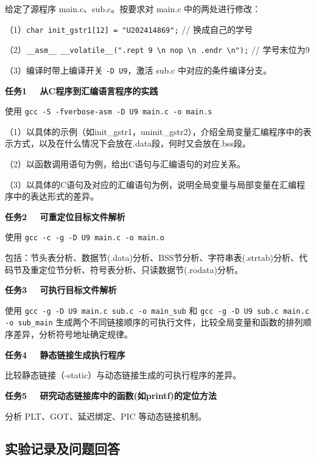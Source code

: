 \documentclass[12pt,a4paper]{ctexart}
\newcommand{\studentid}{U202414869}
\begin{document}
给定了源程序 main.c、sub.c。按要求对 main.c 中的两处进行修改：

（1）\texttt{char init\_gstr1[12] = "\studentid";} \quad // 换成自己的学号

（2）\texttt{\_\_asm\_\_ \_\_volatile\_\_(".rept 9 \textbackslash n nop \textbackslash n .endr \textbackslash n");} \quad // 学号末位为9

（3）编译时带上编译开关 \texttt{-D U9}，激活 sub.c 中对应的条件编译分支。

\vspace{0.3cm}
\textbf{任务1 \ \ 从C程序到汇编语言程序的实践}

使用 \texttt{gcc -S -fverbose-asm -D U9 main.c -o main.s}

（1）以具体的示例（如init\_gstr1，uninit\_gstr2），介绍全局变量汇编程序中的表示方式，以及在什么情况下会放在.data段，何时又会放在.bss段。

（2）以函数调用语句为例，给出C语句与汇编语句的对应关系。

（3）以具体的C语句及对应的汇编语句为例，说明全局变量与局部变量在汇编程序中的表达形式的差异。

\vspace{0.3cm}
\textbf{任务2 \ \ 可重定位目标文件解析}

使用 \texttt{gcc -c -g -D U9 main.c -o main.o}

包括：节头表分析、数据节(.data)分析、BSS节分析、字符串表(.strtab)分析、代码节及重定位节分析、符号表分析、只读数据节(.rodata)分析。

\vspace{0.3cm}
\textbf{任务3 \ \ 可执行目标文件解析}

使用 \texttt{gcc -g -D U9 main.c sub.c -o main\_sub} 和 \texttt{gcc -g -D U9 sub.c main.c -o sub\_main} 生成两个不同链接顺序的可执行文件，比较全局变量和函数的排列顺序差异，分析符号地址确定规律。

\vspace{0.3cm}
\textbf{任务4 \ \ 静态链接生成执行程序}

比较静态链接（-static）与动态链接生成的可执行程序的差异。

\vspace{0.3cm}
\textbf{任务5 \ \ 研究动态链接库中的函数(如printf)的定位方法}

分析 PLT、GOT、延迟绑定、PIC 等动态链接机制。

\newpage

\subsection*{实验记录及问题回答}
\end{document}
